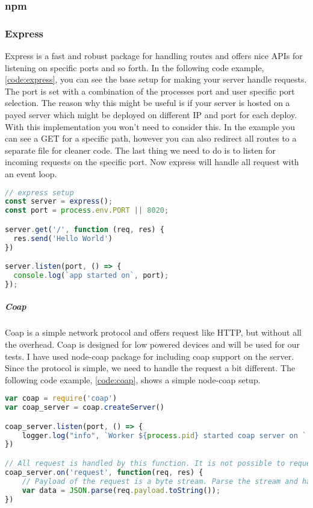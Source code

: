 \documentclass[USenglish]{ifimaster}  %
\begin{document}
\subsubsection{\acrlong{npm}}

\subsubsection{Express}
Express is a fast and robust package for handling routes and offers nice APIs for listening on specific ports and so forth. In the following code example, \vref{code:express}, you can see the base setup for making your server handle requests. The port is set with a combination of the processes port and user specific port selection. The reason why this might be useful is if your server is hosted on a payed server which might be deployed on different IP and port for each deploy. With this implementation you won't need to consider this. In the example you can see a GET for a specific path, however you can also redirect all routes to a separate file for cleaner code. The last thing we need to do is to listen for incoming requests on the specific port. Now express will handle all request with an event loop.

\begin{lstlisting}[caption={Base express setup},label={code:express},language=JavaScript]
// express setup
const server = express();
const port = process.env.PORT || 8020;

server.get('/', function (req, res) {
  res.send('Hello World')
})

server.listen(port, () => {
  console.log(`app started on`, port);
});
\end{lstlisting}

\subparagraph{Coap}
Coap is a simple network protocol and offers request like HTTP, but without all the overhead. Coap is designed for low powered devices and will be used for our tests. I have used node-coap package for including coap support on the server. Since the protocol is simple, we need to handle the request a bit different. The following code example, \vref{code:coap}, shows a simple node-coap setup.

\begin{lstlisting}[caption={Base coap setup},label={code:coap},language=JavaScript]
var coap = require('coap')
var coap_server = coap.createServer()

coap_server.listen(port, () => {
    logger.log("info", `Worker ${process.pid} started coap server on ` + port);
})

// All request is handled by this function. It is not possible to request a specific url path
coap_server.on('request', function(req, res) {
    // Payload of the request is a byte stream. Parse the stream and handle the data
    var data = JSON.parse(req.payload.toString());
})
\end{lstlisting}
\end{document}
